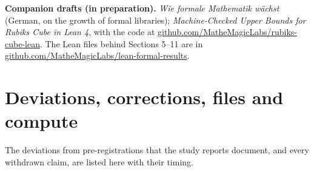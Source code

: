 \documentclass[11pt,a4paper]{article}
\begin{document}
\textbf{Companion drafts (in preparation).} \emph{Wie formale Mathematik wächst} (German, on the growth of formal libraries); \emph{Machine-Checked Upper Bounds for Rubik\textquotesingle s Cube in Lean 4}, with the code at \href{https://github.com/MatheMagicLabs/rubiks-cube-lean}{github.com/\allowbreak{}MatheMagicLabs/\allowbreak{}rubiks-cube-lean}. The Lean files behind Sections 5--11 are in \href{https://github.com/MatheMagicLabs/lean-formal-results}{github.com/\allowbreak{}MatheMagicLabs/\allowbreak{}lean-formal-results}.

\endgroup

\appendix

\section{Deviations, corrections, files and compute}

The deviations from pre-registrations that the study reports document, and every withdrawn claim, are listed here with their timing.
\end{document}
